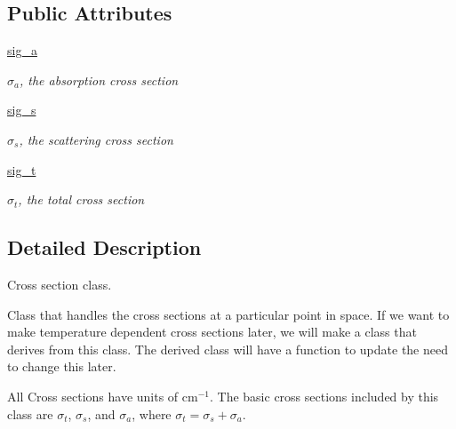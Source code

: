\subsection*{Public Attributes}
\begin{DoxyCompactItemize}
\item 
\hyperlink{classsrc_1_1_cross_x_interface_1_1_cross_x_interface_ab19871ffd067470950336cff88f8b1da}{sig\-\_\-a}
\begin{DoxyCompactList}\small\item\em $\sigma_a$, the absorption cross section \end{DoxyCompactList}\item 
\hyperlink{classsrc_1_1_cross_x_interface_1_1_cross_x_interface_afb10e3cd4777a9b381a31a32071fc0d1}{sig\-\_\-s}
\begin{DoxyCompactList}\small\item\em $\sigma_s$, the scattering cross section \end{DoxyCompactList}\item 
\hyperlink{classsrc_1_1_cross_x_interface_1_1_cross_x_interface_a9aa02ff48c273c3bc0a8213a045e6f4e}{sig\-\_\-t}
\begin{DoxyCompactList}\small\item\em $\sigma_t$, the total cross section \end{DoxyCompactList}\end{DoxyCompactItemize}


\subsection{Detailed Description}
Cross section class. 

Class that handles the cross sections at a particular point in space. If we want to make temperature dependent cross sections later, we will make a class that derives from this class. The derived class will have a function to update the need to change this later.

All Cross sections have units of $\mbox{cm}^{-1}$. The basic cross sections included by this class are $\sigma_t$, $\sigma_s$, and $\sigma_a$, where $\sigma_t = \sigma_s+\sigma_a$. 

